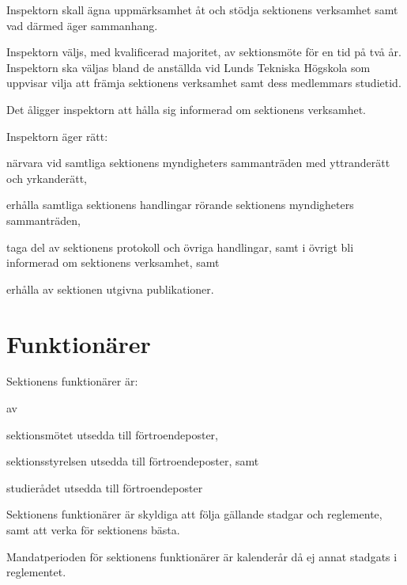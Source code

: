 \documentclass[stadgar]{dsekprotokoll}
\begin{document}
\begin{stadgeavsnitt}


Inspektorn skall ägna uppmärksamhet åt och stödja sektionens verksamhet
samt vad därmed äger sammanhang.

Inspektorn väljs, med kvalificerad majoritet, av sektionsmöte för en tid på två år. Inspektorn ska väljas bland de anställda vid Lunds Tekniska Högskola som uppvisar vilja att främja sektionens verksamhet samt dess medlemmars studietid.


Det åligger inspektorn att hålla sig informerad om sektionens verksamhet.


Inspektorn äger rätt:
\begin{attlista}
\item närvara vid samtliga sektionens myndigheters sammanträden med
  yttranderätt och yrkanderätt,
\item erhålla samtliga sektionens handlingar rörande sektionens
  myndigheters sammanträden,
\item taga del av sektionens protokoll och övriga handlingar, samt i övrigt
  bli informerad om sektionens verksamhet, samt
\item erhålla av sektionen utgivna publikationer.
\end{attlista}

\end{stadgeavsnitt}

\section{Funktionärer}

\begin{stadgeavsnitt}


Sektionens funktionärer är:
\begin{fetlista}{av}
\item sektionsmötet utsedda till förtroendeposter,
\item sektionsstyrelsen utsedda till förtroendeposter, samt
\item studierådet utsedda till förtroendeposter
\end{fetlista}


Sektionens funktionärer är skyldiga att följa gällande stadgar och
reglemente, samt att verka för sektionens bästa.


Mandatperioden för sektionens funktionärer är kalenderår då ej annat
stadgats i reglementet.

\end{stadgeavsnitt}
\end{document}

